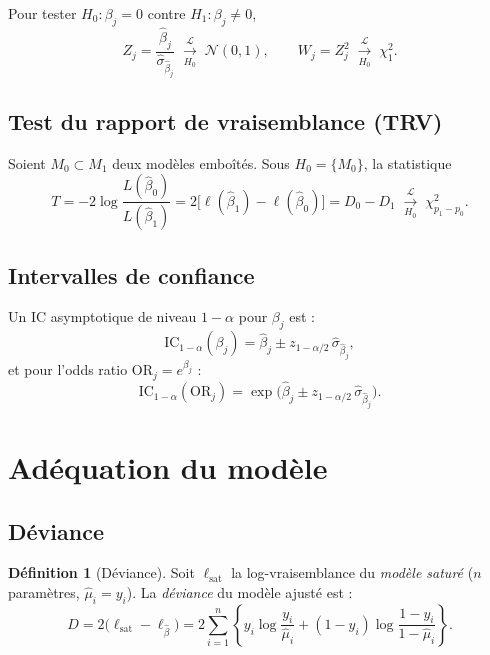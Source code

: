 \documentclass[11pt,a4paper,twoside]{report}
\newcommand{\OR}{\mathrm{OR}}
\theoremstyle{definition}
\newtheorem{definition}{Définition}[chapter]
\begin{document}
Pour tester $H_0 : \beta_j = 0$ contre $H_1 : \beta_j \neq 0$,
\begin{equation}
  Z_j = \frac{\hat\beta_j}{\hat\sigma_{\hat\beta_j}}
  \;\xrightarrow[H_0]{\mathcal{L}}\; \mathcal{N}(0,1),
  \qquad
  W_j = Z_j^2 \;\xrightarrow[H_0]{\mathcal{L}}\; \chi^2_1.
\end{equation}

\subsection{Test du rapport de vraisemblance (TRV)}

Soient $M_0 \subset M_1$ deux modèles emboîtés. Sous
$H_0 = \{M_0\}$, la statistique
\begin{equation}
  T = -2\log\frac{L(\hat\beta_0)}{L(\hat\beta_1)}
    = 2\big[\ell(\hat\beta_1) - \ell(\hat\beta_0)\big]
    = D_0 - D_1
  \;\xrightarrow[H_0]{\mathcal{L}}\; \chi^2_{p_1 - p_0}.
\end{equation}

\subsection{Intervalles de confiance}

Un IC asymptotique de niveau $1-\alpha$ pour $\beta_j$ est :
\begin{equation}
  \mathrm{IC}_{1-\alpha}(\beta_j) = \hat\beta_j \pm z_{1-\alpha/2}\,\hat\sigma_{\hat\beta_j},
\end{equation}
et pour l'odds ratio $\OR_j = e^{\beta_j}$ :
\begin{equation}
  \mathrm{IC}_{1-\alpha}(\OR_j) = \exp\!\Big(\hat\beta_j \pm z_{1-\alpha/2}\,\hat\sigma_{\hat\beta_j}\Big).
\end{equation}

\section{Adéquation du modèle}

\subsection{Déviance}

\begin{definition}[Déviance]
Soit $\ell_{\text{sat}}$ la log-vraisemblance du \emph{modèle saturé}
($n$ paramètres, $\hat\mu_i = y_i$). La \emph{déviance} du modèle
ajusté est :
\begin{equation}
  D = 2\big(\ell_{\text{sat}} - \ell_{\hat\beta}\big)
    = 2\sum_{i=1}^n\left\{ y_i\log\!\frac{y_i}{\hat\mu_i}
      + (1-y_i)\log\!\frac{1-y_i}{1-\hat\mu_i}\right\}.
\end{equation}
\end{definition}
\end{document}
